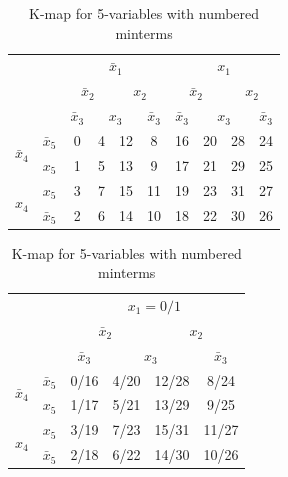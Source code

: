 \documentclass{article}
\newcommand{\bx}{\bar{x}}
\begin{document}
\begin{table}
  \begin{tabular}{c|c|c|c|c|c|c|c|c|c}
  \toprule
  && \multicolumn{4}{c|}{$\bx_1$} & \multicolumn{4}{c}{$x_1$}
    \\
    && \multicolumn{2}{c|}{$\bx_2$} & \multicolumn{2}{c|}{$x_2$}
               & \multicolumn{2}{c|}{$\bx_2$} & \multicolumn{2}{c}{$x_2$}
  \\
  && $\bx_3$ & \multicolumn{2}{c|}{$x_3$} & $\bx_3$
              & $\bx_3$ & \multicolumn{2}{c|}{$x_3$} & $\bx_3$
  \\ \midrule
  \multirow{2}{*}{$\bx_4$} & $\bx_5$
                                  & 0 & 4 & 12 & 8
                                              & 16 & 20 &  28 & 24
  \\
  & $x_5$
                                  & 1 & 5 & 13 & 9
                                              & 17 & 21 &  29 & 25
  \\
  \multirow{2}{*}{$x_4$}   &  $x_5$
                                  & 3 & 7 & 15 & 11
                                              & 19 & 23 &  31 & 27
  \\
  & $\bx_5$
                                  & 2 & 6 & 14 & 10
                                              & 18 & 22 &  30 & 26
  \\\bottomrule
\end{tabular}

\hfill

\begin{tabular}{c|c|cccc}
  \toprule
  && \multicolumn{4}{c}{$x_1 = 0/1$}
  \\
  && \multicolumn{2}{c|}{$\bx_2$} & \multicolumn{2}{c}{$x_2$}
                                    
  \\
  && $\bx_3$ & \multicolumn{2}{|c|}{$x_3$} & $\bx_3$
  \\ \midrule
  \multirow{2}{*}{$\bx_4$} & $\bx_5$
  &
    0/16 & 4/20 &  12/28 & 8/24
  \\
  & $x_5$
  &
    1/17 & 5/21  & 13/29 & 9/25
  \\
  \multirow{2}{*}{$x_4$}   &  $x_5$
  &
    3/19 & 7/23 &  15/31 & 11/27
  \\
  & $\bx_5$
  &
    2/18 & 6/22 & 14/30 & 10/26
  \\\bottomrule
\end{tabular}
\caption{K-map for 5-variables with numbered minterms}
\end{table}
\end{document}
